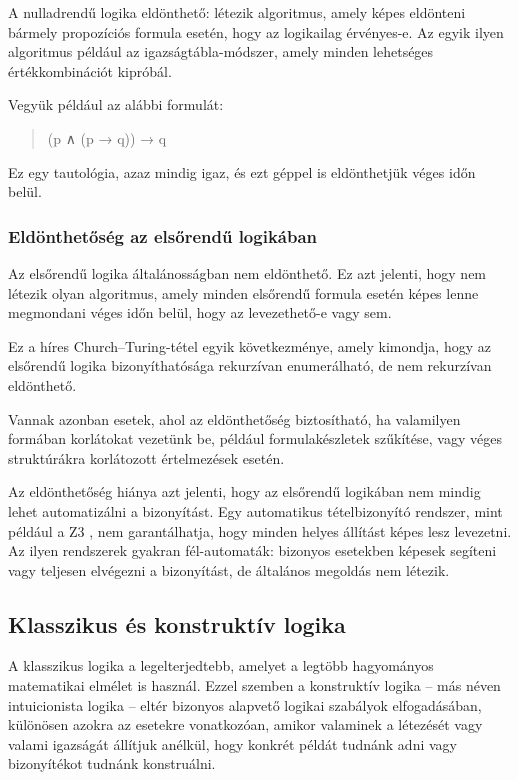 A nulladrendű logika eldönthető: létezik algoritmus, amely képes eldönteni bármely propozíciós formula esetén, hogy az logikailag érvényes-e. Az egyik ilyen algoritmus például az igazságtábla-módszer, amely minden lehetséges értékkombinációt kipróbál.

Vegyük például az alábbi formulát:  
\begin{quote}
(p ∧ (p → q)) → q
\end{quote}

Ez egy tautológia, azaz mindig igaz, és ezt géppel is eldönthetjük véges időn belül.

\subsubsection{Eldönthetőség az elsőrendű logikában}

Az elsőrendű logika általánosságban nem eldönthető. Ez azt jelenti, hogy nem létezik olyan algoritmus, amely minden elsőrendű formula esetén képes lenne megmondani véges időn belül, hogy az levezethető-e vagy sem.

Ez a híres Church–Turing-tétel egyik következménye, amely kimondja, hogy az elsőrendű logika bizonyíthatósága rekurzívan enumerálható, de nem rekurzívan eldönthető.

Vannak azonban esetek, ahol az eldönthetőség biztosítható, ha valamilyen formában korlátokat vezetünk be, például formulakészletek szűkítése, vagy véges struktúrákra korlátozott értelmezések esetén.

Az eldönthetőség hiánya azt jelenti, hogy az elsőrendű logikában nem mindig lehet automatizálni a bizonyítást. Egy automatikus tételbizonyító rendszer, mint például a Z3 \cite{z3}, nem garantálhatja, hogy minden helyes állítást képes lesz levezetni. Az ilyen rendszerek gyakran fél-automaták: bizonyos esetekben képesek segíteni vagy teljesen elvégezni a bizonyítást, de általános megoldás nem létezik.

\subsection{Klasszikus és konstruktív logika}

A klasszikus logika a legelterjedtebb, amelyet a legtöbb hagyományos matematikai elmélet is használ. Ezzel szemben a konstruktív logika – más néven intuicionista logika – eltér bizonyos alapvető logikai szabályok elfogadásában, különösen azokra az esetekre vonatkozóan, amikor valaminek a létezését vagy valami igazságát állítjuk anélkül, hogy konkrét példát tudnánk adni vagy bizonyítékot tudnánk konstruálni.

